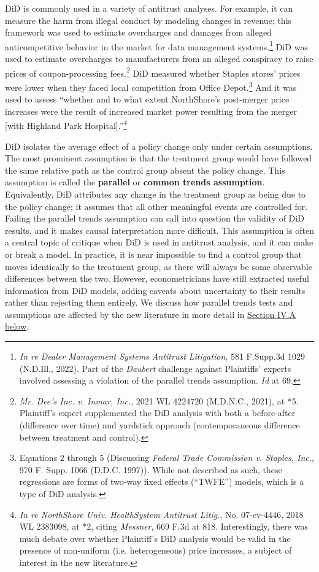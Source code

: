 \documentclass[12pt]{article}
\begin{document}
DiD is commonly used in a variety of antitrust analyses. For example, it can measure the harm from illegal conduct by modeling changes in revenue; this framework was used to estimate overcharges and damages from alleged anticompetitive behavior in the market for data management systems.\footnote{\textit{In re Dealer Management Systems Antitrust Litigation}, 581 F.Supp.3d 1029 (N.D.Ill., 2022). Part of the \textit{Daubert} challenge against Plaintiffs’ experts involved assessing a violation of the parallel trends assumption. \textit{Id} at 69.}  DiD was used to estimate overcharges to manufacturers from an alleged conspiracy to raise prices of coupon-processing fees.\footnote{\textit{Mr. Dee's Inc. v. Inmar, Inc.}, 2021 WL 4224720 (M.D.N.C., 2021), at *5. Plaintiff’s expert supplemented the DiD analysis with both a before-after (difference over time) and yardstick approach (contemporaneous difference between treatment and control). }  DiD measured whether Staples stores’ prices were lower when they faced local competition from Office Depot.\footnote{\citet{ashenfelter2004} Equations 2 through 5 (Discussing  \textit{Federal Trade Commission v. Staples, Inc.}, 970 F. Supp. 1066 (D.D.C. 1997)). While not described as such, these regressions are forms of two-way fixed effects (“TWFE”) models, which is a type of DiD analysis.}  And it was used to assess “whether and to what extent NorthShore's post-merger price increases were the result of increased market power resulting from the merger [with Highland Park Hospital].”\footnote{\textit{In re NorthShore Univ. HealthSystem Antitrust Litig.}, No. 07-cv-4446, 2018 WL 2383098, at *2, citing \textit{Messner}, 669 F.3d at 818. Interestingly, there was much debate over whether Plaintiff’s DiD analysis would be valid in the presence of non-uniform (i.e. heterogeneous) price increases, a subject of interest in the new literature.} 

DiD isolates the average effect of a policy change only under certain assumptions. The most prominent assumption is that the treatment group would have followed the same relative path as the control group absent the policy change. This assumption is called the \textbf{parallel} or \textbf{common trends assumption}. Equivalently, DiD attributes any change in the treatment group as being due to the policy change; it assumes that all other meaningful events are controlled for. Failing the parallel trends assumption can call into question the validity of DiD results, and it makes causal interpretation more difficult. This assumption is often a central topic of critique when DiD is used in antitrust analysis, and it can make or break a model. In practice, it is near impossible to find a control group that moves identically to the treatment group, as there will always be some observable differences between the two. However, econometricians have still extracted useful information from DiD models, adding caveats about uncertainty to their results rather than rejecting them entirely. We discuss how parallel trends tests and assumptions are affected by the new literature in more detail in \hyperref[sec:parallel-trends]{Section IV.A below}.
\end{document}
